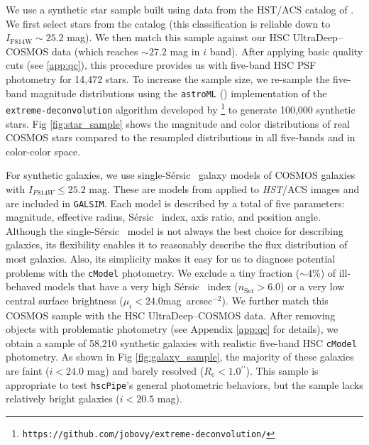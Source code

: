 \documentclass[useamsfonts]{pasj01}
\def\asec{$^{\prime\prime}$}
\def\sb{mag~arcsec$^{-2}$}
\def\ser{{S\'{e}rsic\ }}
\def\hscpipe{\texttt{hscPipe}}
\def\cmodel{\texttt{cModel}}
\def\galsim{\texttt{G}{\scriptsize \texttt{AL}}\texttt{S}{\scriptsize \texttt{IM}}}
\begin{document}
    We use a synthetic star sample built using data from the HST/ACS catalog of 
    \citet{Leauthaud2007}.  
    We first select stars from the \citet{Leauthaud2007} catalog (this classification 
    is reliable down to $I_{\mathrm{F814W}}{\sim}25.2$ mag). 
    We then match this sample against our HSC UltraDeep--COSMOS data (which reaches 
    ${\sim}27.2$ mag in $i$ band). 
    After applying basic quality cuts (see \ref{app:qc}), this procedure provides us 
    with five-band HSC PSF photometry for 14,472 stars.
    To increase the sample size, we re-sample the five-band magnitude distributions 
    using the \texttt{astroML} (\citealt{astroml}) implementation of the 
    \texttt{extreme-deconvolution} algorithm developed by \citet{Bovy2011}
    \footnote{\texttt{https://github.com/jobovy/extreme-deconvolution/}} to
    generate 100,000 synthetic stars. 
    Fig \ref{fig:star_sample} shows the magnitude and color distributions of real 
    COSMOS stars compared to the resampled distributions in all five-bands and in 
    color-color space.

    For synthetic galaxies, we use single-\ser{} galaxy models of COSMOS galaxies with 
    $I_{F814W} \leq 25.2$ mag. 
    These are models from \citet{Lackner2012} applied to \textit{HST}/ACS images and 
    are included in \galsim{}. 
    Each model is described by a total of five parameters: magnitude, effective radius,
    \ser{} index, axis ratio, and position angle.
    Although the single-\ser{} model is not always the best choice for describing 
    galaxies, its flexibility enables it to reasonably describe the flux distribution 
    of most galaxies.
    Also, its simplicity makes it easy for us to diagnose potential problems with the 
    \cmodel{} photometry.
    We exclude a tiny fraction (${\sim}4$\%) of ill-behaved models that have a very 
    high \ser{} index ($n_{\mathrm{Ser}} > 6.0$) or a very low central surface 
    brightness ($\mu_{i} < 24.0$\sb).
    We further match this COSMOS sample with the HSC UltraDeep--COSMOS data.
    After removing objects with problematic photometry (see Appendix \ref{app:qc} for 
    details), we obtain a sample of 58,210 synthetic galaxies with realistic 
    five-band HSC \cmodel{} photometry.
    As shown in Fig \ref{fig:galaxy_sample}, the majority of these galaxies are
    faint ($i<24.0$ mag) and barely resolved ($R_{\mathrm{e}}< 1.0$\asec).
    This sample is appropriate to test \hscpipe{}'s general photometric behaviors, 
    but the sample lacks relatively bright galaxies ($i<20.5$ mag).
\end{document}
